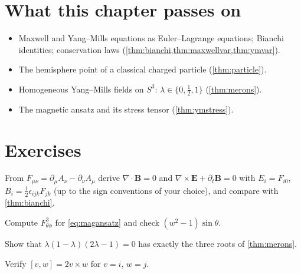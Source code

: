 \section*{What this chapter passes on}
\begin{itemize}[nosep]
\item Maxwell and Yang--Mills equations as Euler--Lagrange equations; Bianchi identities; conservation laws (\cref{thm:bianchi,thm:maxwellvar,thm:ymvar}).
\item The hemisphere point of a classical charged particle (\cref{thm:particle}).
\item Homogeneous Yang--Mills fields on $S^3$: $\lambda\in\{0,\frac12,1\}$ (\cref{thm:merons}).
\item The magnetic ansatz and its stress tensor (\cref{thm:ymstress}).
\end{itemize}

\section*{Exercises}
\begin{exercise}
From $F_{\mu\nu}=\partial_\mu A_\nu-\partial_\nu A_\mu$ derive $\nabla\cdot\mathbf B=0$ and $\nabla\times\mathbf E+\partial_t\mathbf B=0$ with $E_i=F_{i0}$, $B_i=\frac12\epsilon_{ijk}F_{jk}$ (up to the sign conventions of your choice), and compare with \cref{thm:bianchi}.
\end{exercise}
\begin{exercise}
Compute $F^3_{\theta\phi}$ for \eqref{eq:magansatz} and check $(w^2-1)\sin\theta$.
\end{exercise}
\begin{exercise}
Show that $\lambda(1-\lambda)(2\lambda-1)=0$ has exactly the three roots of \cref{thm:merons}.
\end{exercise}
\begin{exercise}
Verify $[v,w]=2v\times w$ for $v=i$, $w=j$.
\end{exercise}

